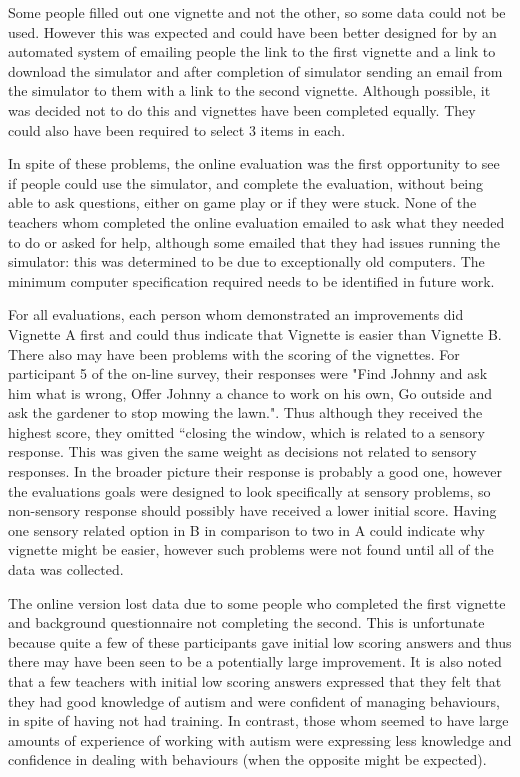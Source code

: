 \documentclass[11pt]{report}
\begin{document}
Some people filled out one vignette and not the other, so some data could not be used. However this was expected and could have been better designed for by an automated system of emailing people the link to the first vignette and a link to download the simulator and after completion of simulator sending an email from the simulator to them with a link to the second vignette. Although possible, it was decided not to do this and vignettes have been completed equally. They could also have been required to select 3 items in each.

In spite of these problems, the online evaluation was the first opportunity to see if people could use the simulator, and complete the evaluation, without being able to ask questions, either on game play or if they were stuck. None of the teachers whom completed the online evaluation emailed to ask what they needed to do or asked for help, although some emailed that they had issues running the simulator: this was determined to be due to exceptionally old computers. The minimum computer specification required needs to be identified in future work.  

For all evaluations, each person whom demonstrated an improvements did Vignette A first and could thus indicate that Vignette is easier than Vignette B. There also may have been problems with the scoring of the vignettes. For participant 5 of the on-line survey, their responses were "Find Johnny and ask him what is wrong, Offer Johnny a chance to work on his own, Go outside and ask the gardener to stop mowing the lawn.". Thus although they received the highest score, they omitted ``closing the window, which is related to a sensory response. This was given the same weight as decisions not related to sensory responses. In the broader picture their response is probably a good one, however the evaluations goals were designed to look specifically at sensory problems, so non-sensory response should possibly have received a lower initial score. Having one sensory related option in B in comparison to two in A could indicate why vignette might be easier, however such problems were not found until all of the data was collected. 

The online version lost data due to some people who completed the first vignette and background questionnaire not completing the second. This is unfortunate because quite a few of these participants gave initial low scoring answers and thus there may have been seen to be a potentially large improvement. It is also noted that a few teachers with initial low scoring answers expressed that they felt that they had good knowledge of autism and were confident of managing behaviours, in spite of having not had training. In contrast, those whom seemed to have large amounts of experience of working with autism were expressing less knowledge and confidence in dealing with behaviours (when the opposite might be expected). 
\end{document}
